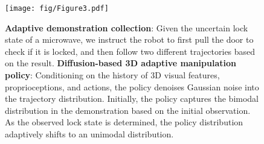 \begin{figure}
\texttt{[image: fig/Figure3.pdf]}
\caption{
\textbf{Adaptive demonstration collection}: Given the uncertain lock state of a microwave, we instruct the robot to first pull the door to check if it is locked, and then follow two different trajectories based on the result. \textbf{Diffusion-based 3D adaptive manipulation policy}: Conditioning on the history of 3D visual features, proprioceptions, and actions, the policy denoises Gaussian noise into the trajectory distribution. Initially, the policy captures the bimodal distribution in the demonstration based on the initial observation. As the observed lock state is determined, the policy distribution adaptively shifts to an unimodal distribution.
}
\vspace{-0.2cm}
\label{fig:fig3}
\end{figure}
